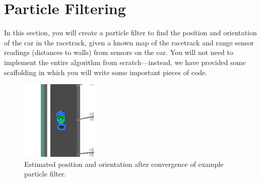 \documentclass[a4paper]{article}
\begin{document}




\section{Particle Filtering}

In this section, you will create a particle filter to find the position and orientation of the car in the racetrack, given a known map of the racetrack and range sensor readings (distances to walls) from sensors on the car. You will not need to implement the entire algorithm from scratch---instead, we have provided some scaffolding in which you will write some important pieces of code.

\begin{figure}[h!]
    \centering
    \includegraphics[scale=0.7]{images/pf_loclalized_crop.png}
    \caption{Estimated position and orientation after convergence of example particle filter.}
    \label{fig:pf_localized_crop}
\end{figure}
\end{document}
